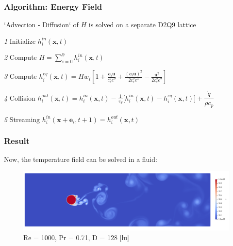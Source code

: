 \documentclass[10pt]{beamer}
\begin{document}
\begin{frame}[plain]\frametitle{Algorithm: Energy Field}
`Advection - Diffusion` of  $H$ is solved on a separate D2Q9 lattice 
\\ \vspace{1.5em}

\textit{1} Initialize 
$ h_i ^{in} (\boldsymbol{x},t) $ \\ \vspace{2.5em}

\textit{2} Compute 
$  H = \sum_{i=0}^{9} h_i ^{in}(\boldsymbol{x},t) $ \\ \vspace{2.5em}

\textit{3} Compute 
$ h_i ^{eq}(\boldsymbol{x},t) = H w_i  
\left[ 1 + \frac{\boldsymbol{e}_i \boldsymbol{u}}{c_s^2 e^2} + \frac{ (\boldsymbol{e}_i \boldsymbol{u})^2}{2 c_s^2 e^4} - \frac{\boldsymbol{u}^2 } {2c_s^2 e^2} \right]  $  \\ \vspace{2.5em}
 
\textit{4} Collision 
$ h_i ^{out}(\boldsymbol{x},t) = h_i^{in}(\boldsymbol{x},t) - \frac{1}{\tau_T} \bigg[ h_i^{in}(\boldsymbol{x},t) - h_i^{eq}(\boldsymbol{x},t) \bigg] + \dfrac{\dot{q}}{\rho c_p}$ \\ \vspace{2.5em}

\textit{5} Streaming 
$  h_i ^{in}(\boldsymbol{x} + \boldsymbol{e}_i ,t+1) =  h_i^{out} (\boldsymbol{x},t) $ \\ \vspace{2.5em}

\end{frame} 

\begin{frame}\frametitle{Result}
Now, the temperature field can be solved in a fluid:

\begin{center}
\begin{figure}
\includegraphics[width = \textwidth]{obrazki/HotKarman_Re1000.png} 
\caption{Re = 1000, Pr = 0.71, D = 128 [lu]}
\end{figure}
\end{center}
\end{frame}
\end{document}
